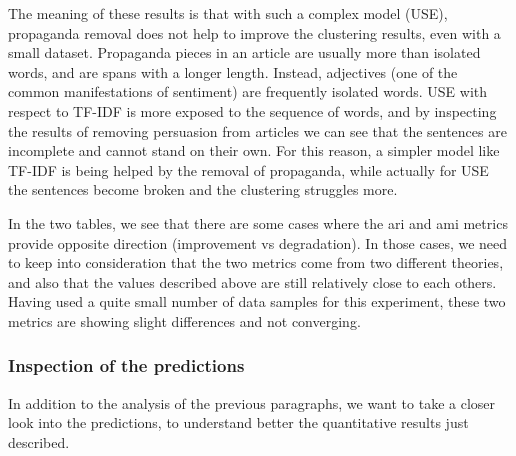 The meaning of these results
is that with such a complex model (USE),
propaganda removal does not help to improve the clustering results, even with a small dataset.
Propaganda pieces in an article are usually more than isolated words, and are spans with a longer length. Instead, adjectives (one of the common manifestations of sentiment) are frequently isolated words. USE with respect to TF-IDF is more exposed to the sequence of words, and by inspecting the results of removing persuasion from articles we can see that the sentences are incomplete and cannot stand on their own. For this reason, a simpler model like TF-IDF is being helped by the removal of propaganda, while actually for USE the sentences become broken and the clustering struggles more.

In the two tables, we see that there are some cases where the \acrshort{ari} and \acrshort{ami} metrics provide opposite direction (improvement vs degradation). In those cases, we need to keep into consideration that the two metrics come from two different theories, and also that the values described above are still relatively close to each others.
Having used a quite small number of data samples for this experiment, these two metrics are showing slight differences and not converging.

\subsubsection{Inspection of the predictions}

In addition to the analysis of the previous paragraphs, we want to take a closer look into the predictions, to understand better the quantitative results just described.

